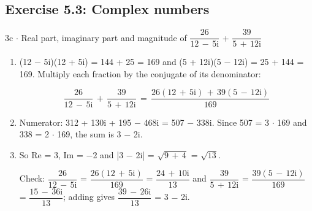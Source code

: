 \documentclass[11pt]{article}
\begin{document}
\begin{keepsection}\subsection{Exercise 5.3: Complex numbers}

\begin{workedbox}{3c \ensuremath{\cdot} Real part, imaginary part and magnitude of {\small\ensuremath{\dfrac{26}{12\, -\, 5\mathrm{i}}}} + {\small\ensuremath{\dfrac{39}{5\, +\, 12\mathrm{i}}}}}
\begin{enumerate}
\item {}
(12 \ensuremath{-} 5i)(12 + 5i) = 144 + 25 = 169 and (5 + 12i)(5 \ensuremath{-} 12i) = 25 + 144 = 169. Multiply each fraction by the conjugate of its denominator:

\begin{equation*}\dfrac{26}{12\, -\, 5\mathrm{i}}\, +\, \dfrac{39}{5\, +\, 12\mathrm{i}}\, =\, \dfrac{26(12\, +\, 5\mathrm{i})\, +\, 39(5\, -\, 12\mathrm{i})}{169}\end{equation*}
\item Numerator: 312 + 130i + 195 \ensuremath{-} 468i = 507 \ensuremath{-} 338i. Since 507 = 3 \ensuremath{\cdot} 169 and 338 = 2 \ensuremath{\cdot} 169, the sum is 3 \ensuremath{-} 2i.
\item {}
So Re = 3, Im = \ensuremath{-}2 and |3 \ensuremath{-} 2i| = \ensuremath{\sqrt{9\, +\, 4}} = \ensuremath{\sqrt{13}}.

Check: {\small\ensuremath{\dfrac{26}{12\, -\, 5\mathrm{i}}}} = {\small\ensuremath{\dfrac{26(12\, +\, 5\mathrm{i})}{169}}} = {\small\ensuremath{\dfrac{24\, +\, 10\mathrm{i}}{13}}} and {\small\ensuremath{\dfrac{39}{5\, +\, 12\mathrm{i}}}} = {\small\ensuremath{\dfrac{39(5\, -\, 12\mathrm{i})}{169}}} = {\small\ensuremath{\dfrac{15\, -\, 36\mathrm{i}}{13}}}; adding gives {\small\ensuremath{\dfrac{39\, -\, 26\mathrm{i}}{13}}} = 3 \ensuremath{-} 2i.
\end{enumerate}
\end{workedbox}

\end{keepsection}
\end{document}
